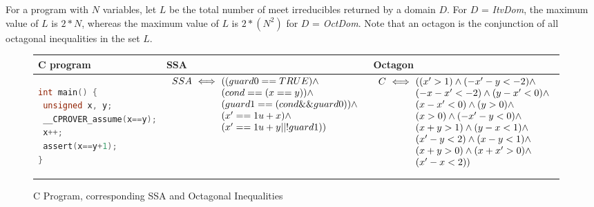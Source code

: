 For a program with $N$ variables, let $L$ be the total number of 
meet irreducibles returned by a domain $D$.  For $D$ = {\em ItvDom}, the 
maximum value of $L$ is $2*N$, whereas the maximum value of $L$ is 
$2*(N^2)$ for $D$ = {\em OctDom}. Note that an octagon is the conjunction 
of all octagonal inequalities in the set $L$.
%
\begin{figure}[t]
\scriptsize
\begin{tabular}{l|l|l}
\hline
C program & SSA & Octagon \\
\hline
\begin{lstlisting}[mathescape=true,language=C]
int main() {
 unsigned x, y;
 __CPROVER_assume(x==y);
 x++;
 assert(x==y+1);
}
\end{lstlisting}
&
\begin{minipage}{4.40cm}
$\begin{array}{l@{\,\,}c@{\,\,}l}
SSA &\iff& ((guard0 == TRUE) \land \\
    &    & (cond == (x == y)) \land \\
    &    & (guard1 == (cond \&\& guard0)) \land \\
    &    & (x' == 1u + x) \land \\
    &    & (x' == 1u + y || !guard1))
\end{array}$
\end{minipage}
&
\begin{minipage}{3.75cm}
$\begin{array}{l@{\,\,}c@{\,\,}l}
C &\iff& ((x' > 1) \land (-x'-y < -2) \land \\
  &    & (-x-x' < -2) \land (y-x' < 0) \land \\                                                                
  &    & (x-x' < 0) \land (y > 0) \land \\
  &    & (x > 0) \land (-x'-y < 0) \land \\
  &    & (x+y > 1) \land (y-x < 1) \land \\
  &    & (x'-y < 2) \land (x-y < 1) \land \\
  &    & (x+y > 0) \land (x+x' > 0) \land \\
  &    & (x'-x < 2))
\end{array}$
\end{minipage}
\\
\hline
\end{tabular}
\caption{C Program, corresponding SSA and Octagonal Inequalities}
\label{swssa}
\end{figure}
%
%    
